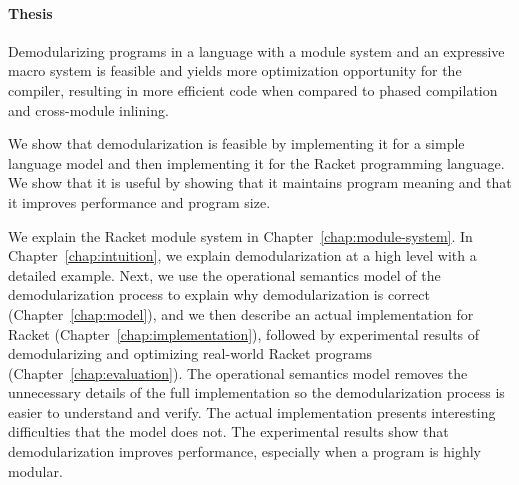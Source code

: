 \paragraph{Thesis} Demodularizing programs in a language with a module system and an expressive macro system is feasible and yields more optimization opportunity for the compiler, resulting in more efficient code when compared to phased compilation and cross-module inlining.

We show that demodularization is feasible by implementing it for a simple language model and then implementing it for the Racket programming language.
We show that it is useful by showing that it maintains program meaning and that it improves performance and program size.

We explain the Racket module system in Chapter~\ref{chap:module-system}. In Chapter~\ref{chap:intuition}, we explain demodularization at a high level with a detailed example.
Next, we use the operational semantics model of the demodularization process to explain why demodularization is correct (Chapter~\ref{chap:model}), and we then describe an actual implementation for Racket (Chapter~\ref{chap:implementation}), followed by experimental results of demodularizing and optimizing real-world Racket programs (Chapter~\ref{chap:evaluation}). 
The operational semantics model removes the unnecessary details of the full implementation so the demodularization process is easier to understand and verify. 
The actual implementation presents interesting difficulties that the model does not.
The experimental results show that demodularization improves performance, especially when a program is highly modular. 
